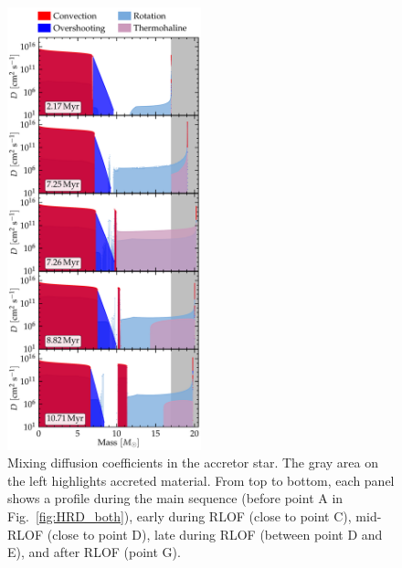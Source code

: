 \documentclass[twocolumn,twocolappendix,trackchanges]{aastex63}
\DeclareRobustCommand{\Figref}[1]{Fig.~\ref{#1}}
\begin{document}
\begin{figure}[htbp]
  \includegraphics[width=0.5\textwidth]{D_mix_vertical}
  \caption{Mixing diffusion coefficients in the accretor star. The
    gray area on the left highlights accreted material. From
    top to bottom, each panel shows a profile during the main sequence
    (before point A in \Figref{fig:HRD_both}),
    early during RLOF (close to point C), mid-RLOF (close to
    point D), late during RLOF (between point D and E), and after RLOF
    (point G).}
  \label{fig:D_mix}
\end{figure}
\end{document}
